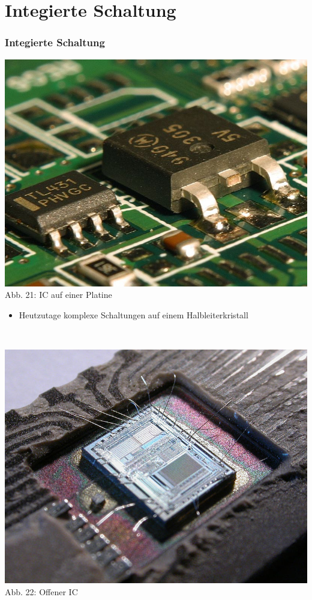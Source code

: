 \section*{Integierte Schaltung}
\begin{frame}
\frametitle{Integierte Schaltung}
\begin{minipage}{0.3\textwidth}
	\includegraphics[scale=0.15]{a06/IC.jpg}\\
	Abb. 21: IC auf einer Platine \cite{wp}
\end{minipage}
\hspace{0.5cm}
\begin{minipage}{0.5\textwidth}
	\begin{itemize}
		\item Heutzutage komplexe Schaltungen auf einem Halbleiterkristall
	\end{itemize}
\end{minipage}\\
\vspace{0.5cm}
\begin{center}
\includegraphics[scale=0.4 ]{a06/IC2.jpg}\\
	Abb. 22: Offener IC \cite{wpen}
\end{center}
\end{frame}

